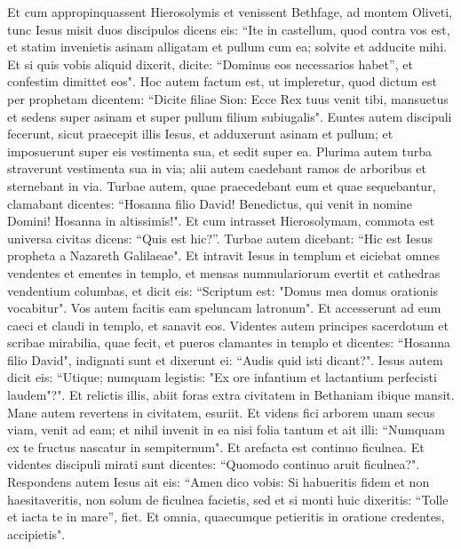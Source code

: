 \begin{biblechapter}  
\verse Et cum appropinquassent Hierosolymis et venissent Bethfage, ad montem Oliveti, tunc Iesus misit duos discipulos 
\verse dicens eis: “Ite in castellum, quod contra vos est, et statim invenietis asinam alligatam et pullum cum ea; solvite et adducite mihi. 
\verse Et si quis vobis aliquid dixerit, dicite: “Dominus eos necessarios habet”, et confestim dimittet eos". 
\verse Hoc autem factum est, ut impleretur, quod dictum est per prophetam dicentem: 
\verse “Dicite filiae Sion: Ecce Rex tuus venit tibi, mansuetus et sedens super asinam et super pullum filium subiugalis". 
\verse Euntes autem discipuli fecerunt, sicut praecepit illis Iesus, 
\verse et adduxerunt asinam et pullum; et imposuerunt super eis vestimenta sua, et sedit super ea. 
\verse Plurima autem turba straverunt vestimenta sua in via; alii autem caedebant ramos de arboribus et sternebant in via. 
\verse Turbae autem, quae praecedebant eum et quae sequebantur, clamabant dicentes: “Hosanna filio David! Benedictus, qui venit in nomine Domini! Hosanna in altissimis!". 
\verse Et cum intrasset Hierosolymam, commota est universa civitas dicens: “Quis est hic?”. 
\verse Turbae autem dicebant: “Hic est Iesus propheta a Nazareth Galilaeae". 
\verse Et intravit Iesus in templum et eiciebat omnes vendentes et ementes in templo, et mensas nummulariorum evertit et cathedras vendentium columbas, 
\verse et dicit eis: “Scriptum est: "Domus mea domus orationis vocabitur". Vos autem facitis eam speluncam latronum". 
\verse Et accesserunt ad eum caeci et claudi in templo, et sanavit eos. 
\verse Videntes autem principes sacerdotum et scribae mirabilia, quae fecit, et pueros clamantes in templo et dicentes: “Hosanna filio David", indignati sunt 
\verse et dixerunt ei: “Audis quid isti dicant?". Iesus autem dicit eis: “Utique; numquam legistis: "Ex ore infantium et lactantium perfecisti laudem"?". 
\verse Et relictis illis, abiit foras extra civitatem in Bethaniam ibique mansit. 
\verse Mane autem revertens in civitatem, esuriit. 
\verse Et videns fici arborem unam secus viam, venit ad eam; et nihil invenit in ea nisi folia tantum et ait illi: “Numquam ex te fructus nascatur in sempiternum". Et arefacta est continuo ficulnea. 
\verse Et videntes discipuli mirati sunt dicentes: “Quomodo continuo aruit ficulnea?". 
\verse Respondens autem Iesus ait eis: “Amen dico vobis: Si habueritis fidem et non haesitaveritis, non solum de ficulnea facietis, sed et si monti huic dixeritis: “Tolle et iacta te in mare”, fiet.  
\verse Et omnia, quaecumque petieritis in oratione credentes, accipietis". 

\end{biblechapter}
